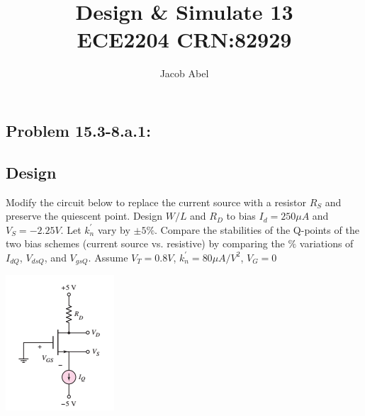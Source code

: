 \documentclass[12pt,letterpaper,titlepage]{article}
\author{Jacob Abel}
\title{	Design \& Simulate 13
	\\\large ECE2204 CRN:82929
}
\begin{document}
\maketitle
\begin{raggedright}

\section{Problem 15.3-8.a.1: } 
\subsection{Design}

Modify the circuit below to replace the current source with a resistor $R_S$ and preserve the quiescent point. Design $W/L$ and $R_D$ to bias $I_d = 250\mu A$ and $V_S = -2.25V$. Let $k_n^\prime$ vary by $\pm 5\%$. Compare the stabilities of the Q-points of the two bias schemes (current source vs. resistive) by comparing the $\%$ variations of $I_{dQ}$, $V_{dsQ}$, and $V_{gsQ}$. Assume $V_T = 0.8V$, $k_n^\prime = 80\mu A/V^2$, $V_G = 0$

\begin{center}
\includegraphics[width=\textwidth, height=12\baselineskip, keepaspectratio=true]{ds1}
\end{center}


\end{raggedright}
\end{document}

